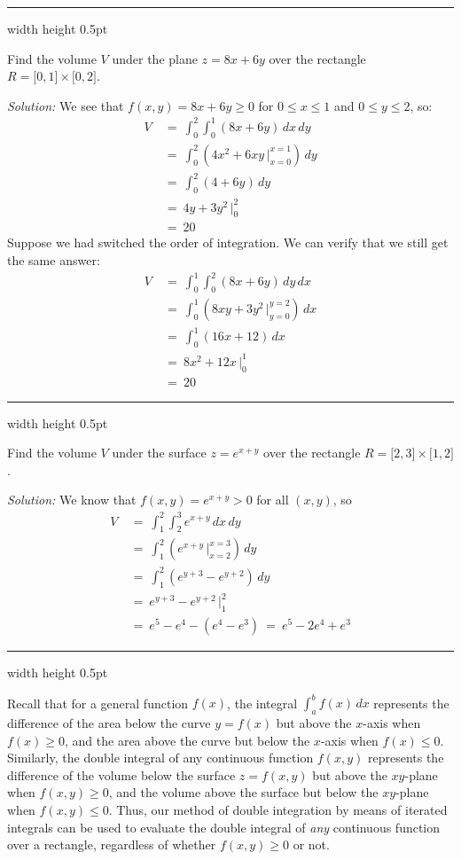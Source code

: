 \medskip
\hrule width \textwidth height 0.5pt
\begin{exmp}\label{exmp:volplane}
 Find the volume $V$ under the plane $z=8x+6y$ over the rectangle $R = \lbrack 0,1 \rbrack \times \lbrack 0,2 \rbrack$.
 \smallskip
 \par\noindent \emph{Solution:} We see that $f(x,y)=8x+6y \ge 0$ for $0 \le x \le 1$ and $0 \le y \le 2$, so:
 \begin{align*}
  V ~&=~ \int_0^2 \int_0^1 (8x+6y)\,dx \,dy\\
   &=~ \int_0^2 \left( 4x^2 + 6xy \,\Big|_{x=0}^{x=1} \right) \,dy\\
   &=~ \int_0^2 (4+6y) \,dy\\
   &=~ 4y+3y^2 \,\Big|_0^2\\
   &=~ 20
 \end{align*}
 Suppose we had switched the order of integration. We can verify that we still get the same answer:
 \begin{align*}
  V ~&=~ \int_0^1 \int_0^2 (8x+6y)\,dy \,dx\\
   &=~ \int_0^1 \left( 8xy + 3y^2 \,\Big|_{y=0}^{y=2} \right) \,dx\\
   &=~ \int_0^1 (16x+12) \,dx\\
   &=~ 8x^2 + 12x \,\Big|_0^1\\
   &=~ 20
 \end{align*}
\end{exmp}
\hrule width \textwidth height 0.5pt
\begin{exmp}
 Find the volume $V$ under the surface $z=e^{x+y}$ over the rectangle $R = \lbrack 2,3 \rbrack \times \lbrack 1,2
  \rbrack$.\smallskip
 \par\noindent \emph{Solution:} We know that $f(x,y)=e^{x+y} > 0$ for all $(x,y)$, so
 \begin{align*}
  V ~&=~ \int_1^2 \int_2^3 e^{x+y} \,dx \,dy\\
   &=~ \int_1^2 \left( e^{x+y} \,\Big|_{x=2}^{x=3} \right) \,dy\\
   &=~ \int_1^2 (e^{y+3} - e^{y+2}) \,dy\\
   &=~ e^{y+3} - e^{y+2} \,\Big|_1^2\\
   &=~ e^5 - e^4 - ( e^4 - e^3 ) ~=~ e^5 - 2e^4 + e^3
 \end{align*}
\end{exmp}
\hrule width \textwidth height 0.5pt
\medskip

Recall that for a general function $f(x)$, the integral $\int_a^b f(x)\, dx$ represents the difference of the area
below the curve $y=f(x)$ but above the $x$-axis when $f(x) \ge 0$, and the area above the curve but below the $x$-axis
when $f(x) \le 0$. Similarly, the double integral of any continuous function $f(x,y)$ represents the difference of the
volume below the surface $z=f(x,y)$ but above the $xy$-plane when $f(x,y) \ge 0$, and the volume above the surface but
below the $xy$-plane when $f(x,y) \le 0$. Thus, our method of double integration by means of iterated integrals can
be used to evaluate the double integral of \emph{any} continuous function over a rectangle, regardless of whether
$f(x,y) \ge 0$ or not.

